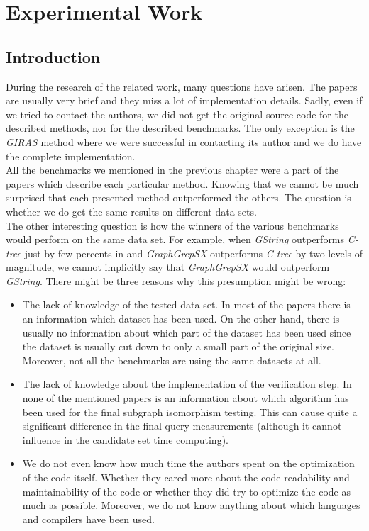 \chapter{Experimental Work}
\section{Introduction}
During the research of the related work, many questions have arisen. The papers are usually very brief and they miss a lot of implementation details. Sadly, even if we tried to contact the authors, we did not get the original source code for the described methods, nor for the described benchmarks. The only exception is the \textit{GIRAS} method where we were successful in contacting its author and we do have the complete implementation.\\

All the benchmarks we mentioned in the previous chapter were a part of the papers which describe each particular method. Knowing that we cannot be much surprised that each presented method outperformed the others. The question is whether we do get the same results on different data sets.\\

The other interesting question is how the winners of the various benchmarks would perform on the same data set. For example, when \textit{GString} outperforms \textit{C-tree} just by few percents in \cite{GString} and \textit{GraphGrepSX} outperforms \textit{C-tree} by two levels of magnitude, we cannot implicitly say that \textit{GraphGrepSX} would outperform \textit{GString}. There might be three reasons why this presumption might be wrong:

\begin{itemize}
	\item The lack of knowledge of the tested data set. In most of the papers there is an information which dataset has been used. On the other hand, there is usually no information about which part of the dataset has been used since the dataset is usually cut down to only a small part of the original size. Moreover, not all the benchmarks are using the same datasets at all.
	
	\item The lack of knowledge about the implementation of the verification step. In none of the mentioned papers is an information about which algorithm has been used for the final subgraph isomorphism testing. This can cause quite a significant difference in the final query measurements (although it cannot influence in the candidate set time computing).
	
	\item We do not even know how much time the authors spent on the optimization of the code itself. Whether they cared more about the code readability and maintainability of the code or whether they did try to optimize the code as much as possible. Moreover, we do not know anything about which languages and compilers have been used.
\end{itemize}

